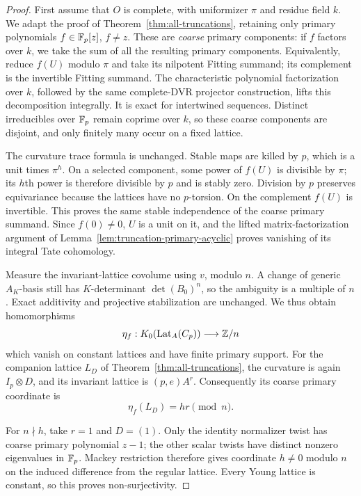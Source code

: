 \begin{proof}
First assume that $O$ is complete, with uniformizer $\pi$ and
residue field $k$.  We adapt the proof of
Theorem~\ref{thm:all-truncations}, retaining only primary
polynomials $f\in\mathbb F_p[z]$, $f\ne z$.
These are \emph{coarse} primary components: if $f$ factors over $k$,
we take the sum of all the resulting primary components.  Equivalently,
reduce $f(U)$ modulo $\pi$ and take its nilpotent Fitting summand;
its complement is the invertible Fitting summand.  The characteristic
polynomial factorization over $k$, followed by the same complete-DVR
projector construction, lifts this decomposition integrally.
It is exact for intertwined sequences.  Distinct irreducibles over
$\mathbb F_p$ remain coprime over $k$, so these coarse components are disjoint,
and only finitely many occur on a fixed lattice.

The curvature trace formula is unchanged.  Stable maps are killed
by $p$, which is a unit times $\pi^h$.  On a selected component,
some power of $f(U)$ is divisible by $\pi$; its $h$th power is
therefore divisible by $p$ and is stably zero.  Division by $p$
preserves equivariance because the lattices have no $p$-torsion.
On the complement $f(U)$ is invertible.  This proves the same
stable independence of the coarse primary summand.  Since $f(0)\ne0$,
$U$ is a unit on it, and the lifted matrix-factorization argument
of Lemma~\ref{lem:truncation-primary-acyclic} proves vanishing of
its integral Tate cohomology.

Measure the invariant-lattice covolume using $v$, modulo $n$.
A change of generic $A_K$-basis still has $K$-determinant
$\det(B_0)^n$, so the ambiguity is a multiple of $n$.
Exact additivity and projective stabilization are unchanged.
We thus obtain homomorphisms
\[
 \eta_f:K_0(\operatorname{Lat}_A(C_p))\longrightarrow\mathbb Z/n
\]
which vanish on constant lattices and have finite primary support.
For the companion lattice $L_D$ of
Theorem~\ref{thm:all-truncations}, the curvature is again
$I_p\otimes D$, and its invariant lattice is $(p,e)A^r$.
Consequently its coarse primary coordinate is
\[
 \eta_f(L_D)=hr\pmod n.
\]

For $n\nmid h$, take $r=1$ and $D=(1)$.
Only the identity normalizer twist has coarse primary polynomial
$z-1$; the other scalar twists have distinct nonzero eigenvalues
in $\mathbb F_p$.  Mackey restriction therefore gives coordinate $h\ne0$
modulo $n$ on the induced difference from the regular lattice.
Every Young lattice is constant, so this proves non-surjectivity.


\end{proof}
